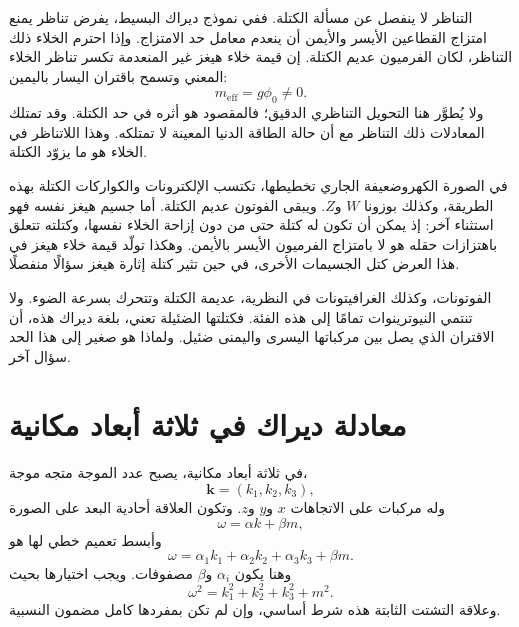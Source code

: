 \begin{classroomqa}
\end{classroomqa}

التناظر لا ينفصل عن مسألة الكتلة. ففي نموذج ديراك البسيط، يفرض تناظر يمنع امتزاج القطاعين الأيسر والأيمن أن ينعدم معامل حد الامتزاج. وإذا احترم الخلاء ذلك التناظر، لكان الفرميون عديم الكتلة. إن قيمة خلاء هيغز غير المنعدمة تكسر تناظر الخلاء المعني وتسمح باقتران اليسار باليمين:
\begin{equation}
m_{\mathrm{eff}}=g\phi_0\neq0.
\end{equation}
ولا يُطوَّر هنا التحويل التناظري الدقيق؛ فالمقصود هو أثره في حد الكتلة. وقد تمتلك المعادلات ذلك التناظر مع أن حالة الطاقة الدنيا المعينة لا تمتلكه. وهذا اللاتناظر في الخلاء هو ما يزوّد الكتلة.

في الصورة الكهروضعيفة الجاري تخطيطها، تكتسب الإلكترونات والكواركات الكتلة بهذه الطريقة، وكذلك بوزونا \(W\) و\(Z\). ويبقى الفوتون عديم الكتلة. أما جسيم هيغز نفسه فهو استثناء آخر: إذ يمكن أن تكون له كتلة حتى من دون إزاحة الخلاء نفسها، وكتلته تتعلق باهتزازات حقله هو لا بامتزاج الفرميون الأيسر بالأيمن. وهكذا تولّد قيمة خلاء هيغز في هذا العرض كتل الجسيمات الأخرى، في حين تثير كتلة إثارة هيغز سؤالًا منفصلًا.

\begin{classroomqa}
\end{classroomqa}

الفوتونات، وكذلك الغرافيتونات في النظرية، عديمة الكتلة وتتحرك بسرعة الضوء. ولا تنتمي النيوترينوات تمامًا إلى هذه الفئة. فكتلتها الضئيلة تعني، بلغة ديراك هذه، أن الاقتران الذي يصل بين مركباتها اليسرى واليمنى ضئيل. ولماذا هو صغير إلى هذا الحد سؤال آخر.

\section{معادلة ديراك في ثلاثة أبعاد مكانية}

في ثلاثة أبعاد مكانية، يصبح عدد الموجة متجه موجة،
\begin{equation}
\mathbf{k}=(k_1,k_2,k_3),
\end{equation}
وله مركبات على الاتجاهات \(x\) و\(y\) و\(z\). وتكون العلاقة أحادية البعد على الصورة
\begin{equation}
\omega=\alpha k+\beta m,
\end{equation}
وأبسط تعميم خطي لها هو
\begin{equation}
\omega
=
\alpha_1 k_1+\alpha_2 k_2+\alpha_3 k_3+\beta m.
\end{equation}
وهنا يكون \(\alpha_i\) و\(\beta\) مصفوفات. ويجب اختيارها بحيث
\begin{equation}
\omega^2=k_1^2+k_2^2+k_3^2+m^2.
\end{equation}
وعلاقة التشتت الثابتة هذه شرط أساسي، وإن لم تكن بمفردها كامل مضمون النسبية.

